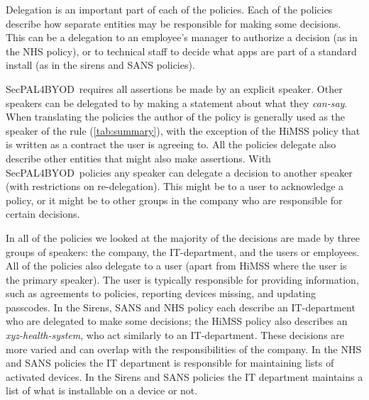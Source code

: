 \documentclass{llncs}
\newcommand{\AppPAL}[0]{SecPAL4BYOD}
\begin{document}
Delegation is an important part of each of the policies.
Each of the policies describe how separate entities may be responsible for making some decisions.
This can be a delegation to an employee's manager to authorize a decision (as in the NHS policy), or to technical staff to decide what apps are part of a standard install (as in the sirens and SANS policies).

\AppPAL~requires all assertions be made by an explicit speaker.
Other speakers can be delegated to by making a statement about what they \emph{can-say}.
When translating the policies the author of the policy is generally used as the speaker of the rule (\autoref{tab:summary}),
  with the exception of the HiMSS policy that is written as a contract the user is agreeing to.
All the policies delegate also describe other entities that might also make assertions.
With \AppPAL~policies any speaker can delegate a decision to another speaker (with restrictions on re-delegation).
This might be to a user to acknowledge a policy, or it might be to other groups in the company who are responsible for certain decisions.

In all of the policies we looked at the majority of the decisions are made by three groups of speakers: 
  the company, the IT-department, and the users or employees.
All of the policies also delegate to a user (apart from HiMSS where the user is the primary speaker).
The user is typically responsible for providing information, such as agreements to policies, reporting devices missing, and updating passcodes.
In the Sirens, SANS and NHS policy each describe an IT-department who are delegated to make some decisions;
  the HiMSS policy also describes an \emph{xyz-health-system}, who act similarly to an IT-department.
These decisions are more varied and can overlap with the responsibilities of the company.
In the NHS and SANS policies the IT department is responsible for maintaining lists of activated devices.
In the Sirens and SANS policies the IT department maintains a list of what is installable on a device or not.

\end{document}
